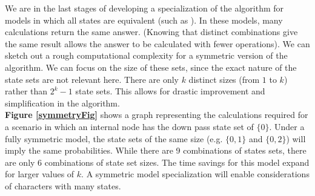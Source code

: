 \documentclass[a0paper,landscape]{baposter}
\begin{document}
\begin{poster}
{%
We are in the last stages of developing a specialization of the algorithm for models in which all states are equivalent (such as \citep{Lewis2001}).
In these models, many calculations return the same answer. (Knowing that distinct combinations give the same result allows the answer to be calculated with fewer operations). 
We can sketch out a rough computational complexity for a symmetric version of the algorithm.
We can focus on the size of these sets, since the exact nature of the state sets are not relevant here.  
There are only $k$ distinct sizes (from $1$ to $k$) rather than $2^{k}-1$ state sets.
This allows for drastic improvement and simplification in the algorithm.\\
{\bf Figure \ref{symmetryFig}} shows a graph representing the calculations required for 
a scenario in which an internal node has the down pass state set of $\{0\}$.
Under a fully symmetric model, the state sets of the same size (e.g. $\{0,1\}$ and $\{0,2\}$) will imply the same probabilities.
While there are 9 combinations of states sets, there are only 6 combinations of state set sizes.
The time savings for this model expand for larger values of $k$.
A symmetric model specialization will enable considerations of characters with many states.

}
\end{poster}
\end{document}
